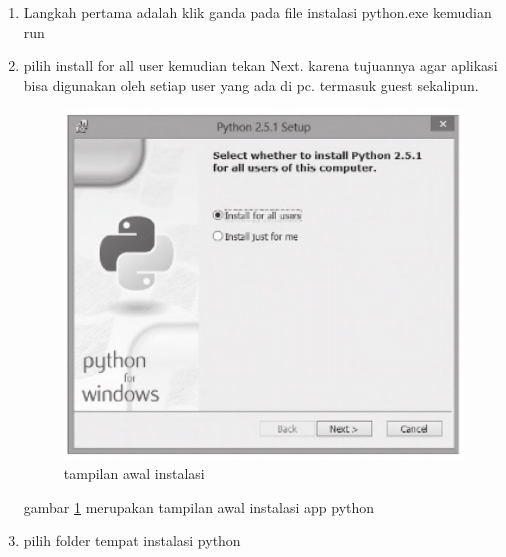 	\begin {enumerate}
	\item
	Langkah pertama adalah klik ganda pada file instalasi python.exe
	kemudian run

	\item
	pilih install for all user kemudian tekan Next. karena tujuannya
	agar aplikasi bisa digunakan oleh setiap user yang ada di pc.
	termasuk guest sekalipun.
			
	\begin{figure}[ht]
	\centerline{\includegraphics[width=1\textwidth]{figures/awal.PNG}}
	\caption{tampilan awal instalasi}
	\label{awal}
	\end{figure}
	
	gambar \ref {awal} merupakan tampilan awal instalasi app python
	
	\item
	pilih folder tempat instalasi python
	

\end{enumerate}
